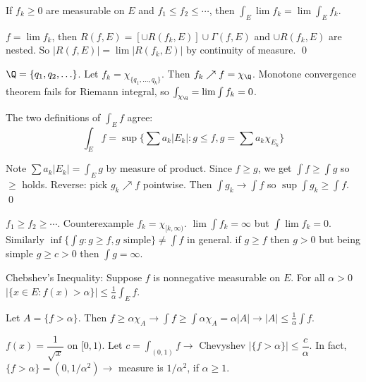 \begin{thm}
If $f_k \geq 0$ are measurable on $E$ and $f_1 \leq f_2 \leq \cdots$, then $\int_E \lim f_k = \lim \int_E f_k$.
\end{thm}

\pf $f= \lim f_k$, then $R(f,E)= [\cup R(f_k,E)] \cup \Gamma(f,E)$ and $\cup R(f_k,E)$ are nested. So $|R(f,E)|= \lim |R(f_k,E)|$ by continuity of measure. \qed \\


\begin{ex}
$\Q=\{q_1,q_2,\ldots\}$. Let $f_k= \chi_{\{q_1,\ldots,q_k\}}$. Then $f_k \nearrow f= \chi_\Q$. Monotone convergence theorem fails for Riemann integral, so $\int_{\chi_\Q}= \lim \int f_k=0$. 
\end{ex}



\begin{thm}
The two definitions of $\int_E f$ agree:
	\[
	\int_E f= \sup\{ \sum a_k |E_k| \colon g \leq f, g= \sum a_k \chi_{E_k}\}
	\]
\end{thm}

\pf Note $\sum a_k |E_k|= \int_E g$ by measure of product. Since $f \geq g$, we get $\int f \geq \int g$ so $\geq$ holds. Reverse: pick $g_k \nearrow f$ pointwise. Then $\int g_k \to \int f$ so $\sup \int g_k \geq \int f$. \qed \\



\begin{ex}
$f_1 \geq f_2 \geq \cdots$. Counterexample $f_k= \chi_{[k,\infty)}$. $\lim \int f_k= \infty$ but $\int \lim f_k=0$. Similarly $\inf\{ \int g \colon g \geq f, g \text{ simple}\} \neq \int f$ in general. if $g \geq f$ then $g>0$ but being simple $g \geq c>0$ then $\int g= \infty$. 
\end{ex}


Chebshev's Inequality: Suppose $f$ is nonnegative measurable on $E$. For all $\alpha>0$ $|\{ x \in E \colon f(x)>\alpha \}| \leq \frac{1}{\alpha} \int_E f$.

\pf Let $A=\{f>\alpha\}$. Then $f \geq \alpha \chi_A \to \int f \geq \int \alpha \chi_A= \alpha |A| \to |A| \leq \frac{1}{\alpha} \int f$.


\begin{ex}
$f(x)= \dfrac{1}{\sqrt{x}}$ on $[0,1)$. Let $c= \int_{(0,1)} f \to$ Chevyshev $|\{f>\alpha\}| \leq \dfrac{c}{\alpha}$. In fact, $\{f>\alpha\}= (0,1/\alpha^2) \to$ measure is $1/\alpha^2$, if $\alpha \geq 1$. 
\end{ex}



